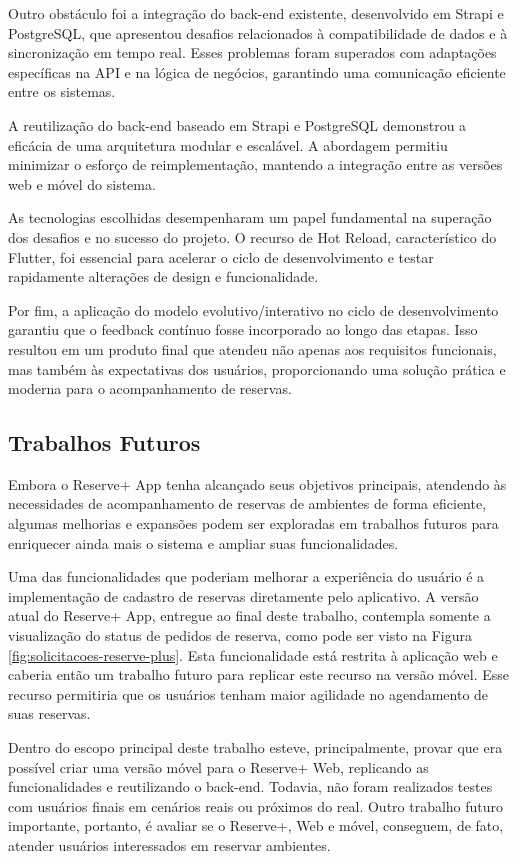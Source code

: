 \documentclass[12pt]{article}
\begin{document}
Outro obstáculo foi a integração do back-end existente, desenvolvido em Strapi e PostgreSQL, que apresentou desafios relacionados à compatibilidade de dados e à sincronização em tempo real. Esses problemas foram superados com adaptações específicas na API e na lógica de negócios, garantindo uma comunicação eficiente entre os sistemas.

A reutilização do back-end baseado em Strapi e PostgreSQL demonstrou a eficácia de uma arquitetura modular e escalável. A abordagem permitiu minimizar o esforço de reimplementação, mantendo a integração entre as versões web e móvel do sistema.

As tecnologias escolhidas desempenharam um papel fundamental na superação dos desafios e no sucesso do projeto. O recurso de Hot Reload, característico do Flutter, foi essencial para acelerar o ciclo de desenvolvimento e testar rapidamente alterações de design e funcionalidade.

Por fim, a aplicação do modelo evolutivo/interativo no ciclo de desenvolvimento garantiu que o feedback contínuo fosse incorporado ao longo das etapas. Isso resultou em um produto final que atendeu não apenas aos requisitos funcionais, mas também às expectativas dos usuários, proporcionando uma solução prática e moderna para o acompanhamento de reservas.

\subsection{Trabalhos Futuros} \label{sec:future-work}

Embora o Reserve+ App tenha alcançado seus objetivos principais, atendendo às necessidades de acompanhamento de reservas de ambientes de forma eficiente, algumas melhorias e expansões podem ser exploradas em trabalhos futuros para enriquecer ainda mais o sistema e ampliar suas funcionalidades. 

Uma das funcionalidades que poderiam melhorar a experiência do usuário é a implementação de cadastro de reservas diretamente pelo aplicativo. A versão atual do Reserve+ App, entregue ao final deste trabalho, contempla somente a visualização do status de pedidos de reserva, como pode ser visto na Figura \ref{fig:solicitacoes-reserve-plus}. Esta funcionalidade está restrita à aplicação web e caberia então um trabalho futuro para replicar este recurso na versão móvel. Esse recurso permitiria que os usuários tenham maior agilidade no agendamento de suas reservas.

Dentro do escopo principal deste trabalho esteve, principalmente, provar que era possível criar uma versão móvel para o Reserve+ Web, replicando as funcionalidades e reutilizando o back-end. Todavia, não foram realizados testes com usuários finais em cenários reais ou próximos do real. Outro trabalho futuro importante, portanto, é avaliar se o Reserve+, Web e móvel, conseguem, de fato, atender usuários interessados em reservar ambientes.
\end{document}
